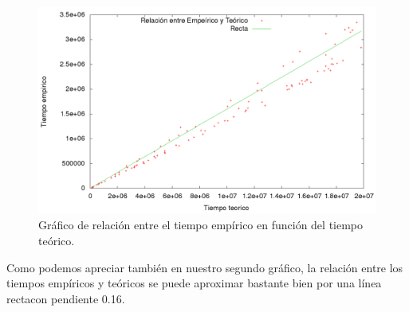 \begin{figure}[H]
\begin{center}
\includegraphics[scale=0.35]{./imagenes/ej2_chartRendimiento2.png}
\caption{Gráfico de relación entre el tiempo empírico en función del tiempo teórico.}
\end{center}
\end{figure}

Como podemos apreciar también en nuestro segundo gráfico, la relación entre los tiempos empíricos y teóricos se puede aproximar bastante bien por una línea rectacon pendiente 0.16.